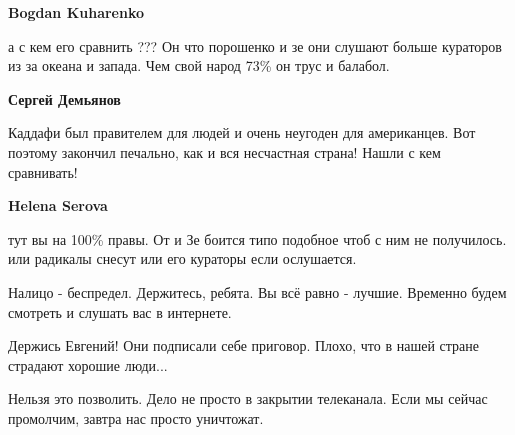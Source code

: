 \begin{itemize}
\begin{itemize}
\textbf{Bogdan Kuharenko} 

а с кем его сравнить ??? Он что порошенко и зе они слушают больше кураторов из
за океана и запада. Чем свой народ 73\% он трус и балабол.

\textbf{Сергей Демьянов} 

Каддафи был правителем для людей и очень неугоден для американцев. Вот поэтому
закончил печально, как и вся несчастная страна! Нашли с кем сравнивать!

\textbf{Helena Serova} 

тут вы на 100\% правы. От и Зе боится типо подобное чтоб с ним не получилось.
или радикалы снесут или его кураторы если ослушается.

\end{itemize} %

Налицо - беспредел. Держитесь, ребята. Вы всё равно - лучшие. Временно будем
смотреть и слушать вас в интернете.

Держись Евгений! Они подписали себе приговор. Плохо, что в нашей стране
страдают хорошие люди...


Нельзя это позволить. Дело не просто в закрытии телеканала. Если мы сейчас
промолчим, завтра нас просто уничтожат.

\end{itemize} %
